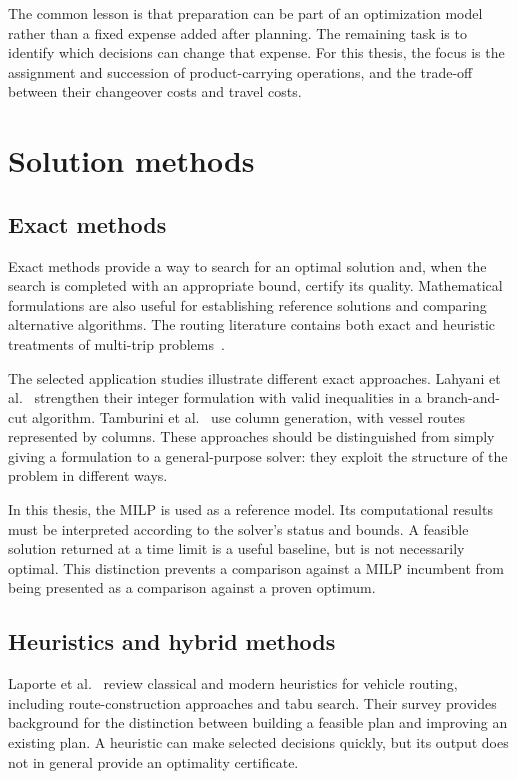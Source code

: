 The common lesson is that preparation can be part of an optimization model
rather than a fixed expense added after planning. The remaining task is to
identify which decisions can change that expense. For this thesis, the focus
is the assignment and succession of product-carrying operations, and the
trade-off between their changeover costs and travel costs.

\section{Solution methods}\label{sec:solution-methods}

\subsection{Exact methods}

Exact methods provide a way to search for an optimal solution and, when the
search is completed with an appropriate bound, certify its quality.
Mathematical formulations are also useful for establishing reference
solutions and comparing alternative algorithms. The routing literature
contains both exact and heuristic treatments of multi-trip
problems~\cite{cattaruzza2016multipletrips}.

The selected application studies illustrate different exact approaches.
Lahyani et al.~\cite{lahyani2015oilmulticompartment} strengthen their integer
formulation with valid inequalities in a branch-and-cut algorithm.
Tamburini et al.~\cite{TAMBURINI2025104019} use column generation, with vessel
routes represented by columns. These approaches should be distinguished
from simply giving a formulation to a general-purpose solver: they exploit
the structure of the problem in different ways.

In this thesis, the MILP is used as a reference model. Its computational
results must be interpreted according to the solver's status and bounds.
A feasible solution returned at a time limit is a useful baseline, but is
not necessarily optimal. This distinction prevents a comparison against a
MILP incumbent from being presented as a comparison against a proven optimum.

\subsection{Heuristics and hybrid methods}

Laporte et al.~\cite{laporte2000heuristics} review classical and modern
heuristics for vehicle routing, including route-construction approaches and
tabu search. Their survey provides background for the distinction between
building a feasible plan and improving an existing plan. A heuristic can
make selected decisions quickly, but its output does not in general provide
an optimality certificate.


